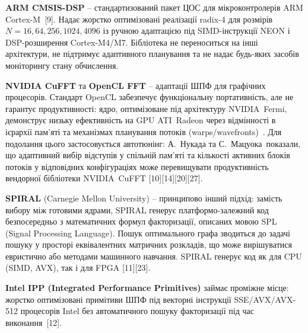 \documentclass[
]{article}
\begin{document}
\textbf{ARM CMSIS-DSP} -- стандартизований пакет ЦОС для
мікроконтролерів ARM Cortex-M~{[}9{]}. Надає жорстко оптимізовані
реалізації radix-4 для розмірів \(N = 16,64,256,1024,4096\) із ручною
адаптацією під SIMD-інструкції NEON і DSP-розширення Cortex-M4/M7.
Бібліотека не переноситься на інші архітектури, не підтримує адаптивного
планування та не надає будь-яких засобів моніторингу стану обчислення.

\textbf{NVIDIA CuFFT} та \textbf{OpenCL FFT} -- адаптації ШПФ для
графічних процесорів. Стандарт OpenCL забезпечує функціональну
портативність, але не гарантує продуктивності: ядро, оптимізоване під
архітектуру NVIDIA~Fermi, демонструє низьку ефективність на GPU
ATI~Radeon через відмінності в ієрархії пам'яті та механізмах планування
потоків (warps/wavefronts)~. Для подолання цього застосовується
автотюнінг: А.~Нукада та С.~Мацуока~показали, що адаптивний вибір
відступів у спільній пам'яті та кількості активних блоків потоків у
відповідних конфігураціях може перевищувати продуктивність вендорної
бібліотеки NVIDIA~CuFFT {[}10{]}{[}14{]}{[}20{]}{[}27{]}.

\textbf{SPIRAL} (Carnegie Mellon University) -- принципово інший підхід:
замість вибору між готовими ядрами, SPIRAL генерує платформо-залежний
код безпосередньо з математичних формул факторизації, описаних мовою SPL
(Signal Processing Language). Пошук оптимального графа зводиться до
задачі пошуку у просторі еквівалентних матричних розкладів, що може
вирішуватися евристично або методами машинного навчання. SPIRAL генерує
код як для CPU (SIMD, AVX), так і для FPGA {[}11{]}{[}23{]}.

\textbf{Intel IPP (Integrated Performance Primitives)} займає проміжне
місце: жорстко оптимізовані примітиви ШПФ під векторні інструкції
SSE/AVX/AVX-512 процесорів Intel без автоматичного пошуку факторизації
під час виконання~{[}12{]}.
\end{document}
